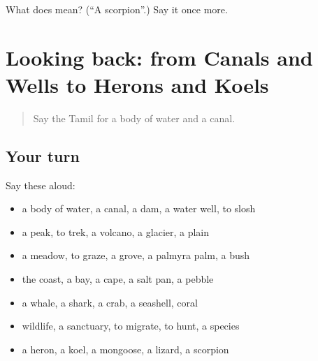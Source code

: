 \begin{tcolorbox}[breakable,colback=teal!4,colframe=teal!35!black,title={Before you move on}]
What does  mean? (\textquotedblleft{}A scorpion\textquotedblright{}.) Say it once more.
\end{tcolorbox}
\section[(dialogue)]{Looking back: from Canals and Wells to Herons and Koels}

\label{lesson:TA-R438-review-432-438}



\begin{quote}
Say the Tamil for a body of water and a canal.
\end{quote}

\subsection*{Your turn}
Say these aloud:

\begin{itemize}
\raggedright
  \item a body of water, a canal, a dam, a water well, to slosh
  \item a peak, to trek, a volcano, a glacier, a plain
  \item a meadow, to graze, a grove, a palmyra palm, a bush
  \item the coast, a bay, a cape, a salt pan, a pebble
  \item a whale, a shark, a crab, a seashell, coral
  \item wildlife, a sanctuary, to migrate, to hunt, a species
  \item a heron, a koel, a mongoose, a lizard, a scorpion
\end{itemize}

